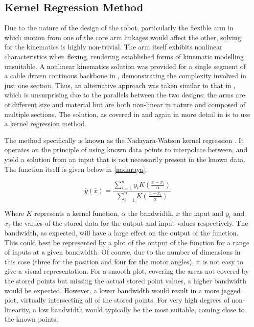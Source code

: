 \documentclass[11pt]{article}
\begin{document}
\subsection{Kernel Regression Method}
Due to the nature of the design of the robot, particularly the flexible arm in which motion from one of the core arm linkages would affect the other, solving for the kinematics is highly non-trivial. The arm itself exhibits nonlinear characteristics when flexing, rendering established forms of kinematic modelling unsuitable. A nonlinear kinematics solution was provided for a single segment of a cable driven continous backbone in \cite{li2002}, demonstrating the complexity involved in just one section. Thus, an alternative approach was taken similar to that in \cite{GreggSmithDesign}, which is unsurprising due to the parallels between the two designs; the arms are of different size and material but are both non-linear in nature and composed of multiple sections. The solution, as covered in \cite{GreggSmithDesign} and again in more detail in \cite{GreggSmithPhd} is to use a kernel regression method.

The method specifically is known as the Nadayara-Watson kernel regression \cite{nadaraya1964}. It operates on the principle of using known data points to interpolate between, and yield a solution from an input that is not necessarily present in the known data. The function itself is given below in \eqref{nadaraya}.

\begin{equation}\label{nadaraya}
\bar{y}(\bar{x}) = \frac{\sum_{i=1}^{n}y_{i}K(\frac{x - x_{i}}{\alpha})}{\sum_{i=1}^{n}K(\frac{x - x_{i}}{\alpha})}
\end{equation}

Where $K$ represents a kernel function, $\alpha$ the bandwidth, $x$ the input and $y_{i}$ and $x_{i}$ the values of the stored data for the output and input values respectively. The bandwidth, as expected, will have a large effect on the output of the function. This could best be represented by a plot of the output of the function for a range of inputs at a given bandwidth. Of course, due to the number of dimensions in this case (three for the position and four for the motor angles), it is not easy to give a visual representation. For a smooth plot, covering the areas not covered by the stored points but missing the actual stored point values, a higher bandwidth would be expected. However, a lower bandwidth would result in a more jagged plot, virtually intersecting all of the stored points. For very high degrees of non-linearity, a low bandwidth would typically be the most suitable, coming close to the known points. 
\end{document}

